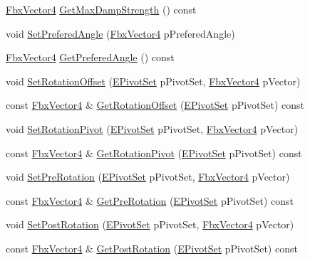 \begin{DoxyCompactItemize}
\item 
\hyperlink{class_fbx_vector4}{Fbx\+Vector4} \hyperlink{class_fbx_node_a6290154866d9fdb5314457d58277fbbd}{Get\+Max\+Damp\+Strength} () const
\item 
void \hyperlink{class_fbx_node_ab818f1d02667c73d9610acc1ea4a7426}{Set\+Prefered\+Angle} (\hyperlink{class_fbx_vector4}{Fbx\+Vector4} p\+Prefered\+Angle)
\item 
\hyperlink{class_fbx_vector4}{Fbx\+Vector4} \hyperlink{class_fbx_node_a4f7c629e1004164f09a751432a442f74}{Get\+Prefered\+Angle} () const
\item 
void \hyperlink{class_fbx_node_adfb076b476353dde01ba411c487477bf}{Set\+Rotation\+Offset} (\hyperlink{class_fbx_node_ae62b7311ac4727654cdf1ebd5cbf7343}{E\+Pivot\+Set} p\+Pivot\+Set, \hyperlink{class_fbx_vector4}{Fbx\+Vector4} p\+Vector)
\item 
const \hyperlink{class_fbx_vector4}{Fbx\+Vector4} \& \hyperlink{class_fbx_node_ad234dda15a2a724fde3ecd723d5e8585}{Get\+Rotation\+Offset} (\hyperlink{class_fbx_node_ae62b7311ac4727654cdf1ebd5cbf7343}{E\+Pivot\+Set} p\+Pivot\+Set) const
\item 
void \hyperlink{class_fbx_node_aa03d51b621dd88e32c1209b3d4a0aa7d}{Set\+Rotation\+Pivot} (\hyperlink{class_fbx_node_ae62b7311ac4727654cdf1ebd5cbf7343}{E\+Pivot\+Set} p\+Pivot\+Set, \hyperlink{class_fbx_vector4}{Fbx\+Vector4} p\+Vector)
\item 
const \hyperlink{class_fbx_vector4}{Fbx\+Vector4} \& \hyperlink{class_fbx_node_ab0ca056f4773e45eeb10c8afe9d439bd}{Get\+Rotation\+Pivot} (\hyperlink{class_fbx_node_ae62b7311ac4727654cdf1ebd5cbf7343}{E\+Pivot\+Set} p\+Pivot\+Set) const
\item 
void \hyperlink{class_fbx_node_ac15a436bf09b95e030af68481606615e}{Set\+Pre\+Rotation} (\hyperlink{class_fbx_node_ae62b7311ac4727654cdf1ebd5cbf7343}{E\+Pivot\+Set} p\+Pivot\+Set, \hyperlink{class_fbx_vector4}{Fbx\+Vector4} p\+Vector)
\item 
const \hyperlink{class_fbx_vector4}{Fbx\+Vector4} \& \hyperlink{class_fbx_node_a73ab4581c4eccfe9b1cc56045102dc50}{Get\+Pre\+Rotation} (\hyperlink{class_fbx_node_ae62b7311ac4727654cdf1ebd5cbf7343}{E\+Pivot\+Set} p\+Pivot\+Set) const
\item 
void \hyperlink{class_fbx_node_ac40aa0ae2187a83a8195cb31e49df18e}{Set\+Post\+Rotation} (\hyperlink{class_fbx_node_ae62b7311ac4727654cdf1ebd5cbf7343}{E\+Pivot\+Set} p\+Pivot\+Set, \hyperlink{class_fbx_vector4}{Fbx\+Vector4} p\+Vector)
\item 
const \hyperlink{class_fbx_vector4}{Fbx\+Vector4} \& \hyperlink{class_fbx_node_a7a60a83de24636c96067cff6a79903f5}{Get\+Post\+Rotation} (\hyperlink{class_fbx_node_ae62b7311ac4727654cdf1ebd5cbf7343}{E\+Pivot\+Set} p\+Pivot\+Set) const

\end{DoxyCompactItemize}
